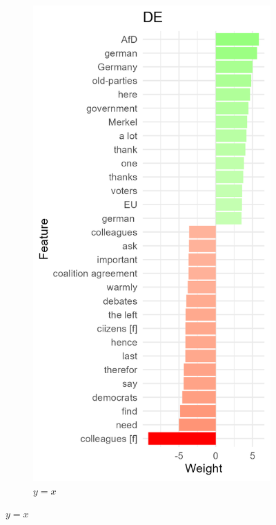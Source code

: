 \documentclass{article}
\begin{document}
\begin{figure}
     \centering
     \begin{subfigure}[b]{0.3\textwidth}
         \centering
         \includegraphics[width=\textwidth]{DE/vis/DE_weights.png}
         \caption{$y=x$}

\end{subfigure}
\end{figure}
\end{document}
